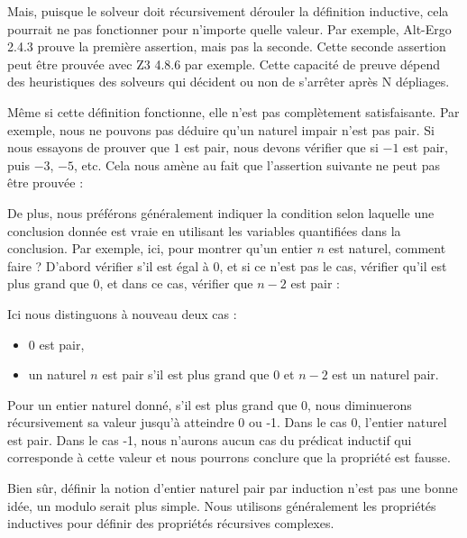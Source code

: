 Mais, puisque le solveur doit récursivement dérouler la définition inductive,
cela pourrait ne pas fonctionner pour n'importe quelle valeur. Par exemple,
Alt-Ergo 2.4.3 prouve la première assertion, mais pas la seconde. Cette seconde
assertion peut être prouvée avec Z3 4.8.6 par exemple. Cette capacité de preuve
dépend des heuristiques des solveurs qui décident ou non de s'arrêter après N
dépliages.

Même si cette définition fonctionne, elle n'est pas complètement satisfaisante.
Par exemple, nous ne pouvons pas déduire qu'un naturel impair n'est pas pair. Si
nous essayons de prouver que $1$ est pair, nous devons vérifier que si $-1$ est
pair, puis $-3$, $-5$, etc. Cela nous amène au fait que l'assertion suivante ne
peut pas être prouvée :




De plus, nous préférons généralement indiquer la condition selon laquelle une
conclusion donnée est vraie en utilisant les variables quantifiées dans la
conclusion. Par exemple, ici, pour montrer qu'un entier $n$ est naturel,
comment faire ? D'abord vérifier s'il est égal à 0, et si ce n'est pas le cas,
vérifier qu'il est plus grand que 0, et dans ce cas, vérifier que $n-2$ est
pair :




Ici nous distinguons à nouveau deux cas :

\begin{itemize}
\item 0 est pair,
\item un naturel $n$ est pair s'il est plus grand que $0$ et $n-2$ est un
      naturel pair.
\end{itemize}


Pour un entier naturel donné, s'il est plus grand que 0, nous diminuerons
récursivement sa valeur jusqu'à atteindre 0 ou -1. Dans le cas 0, l'entier
naturel est pair. Dans le cas -1, nous n'aurons aucun cas du prédicat inductif
qui corresponde à cette valeur et nous pourrons conclure que la propriété est
fausse.




Bien sûr, définir la notion d'entier naturel pair par induction n'est pas une
bonne idée, un modulo serait plus simple. Nous utilisons généralement les
propriétés inductives pour définir des propriétés récursives complexes.





